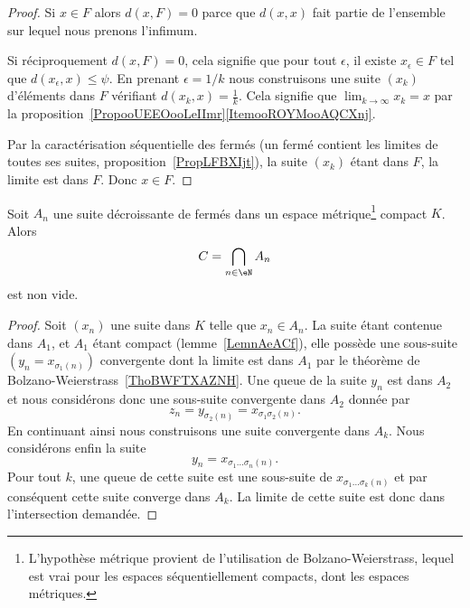 \begin{proof}
    Si \( x\in F\) alors \( d(x,F)=0\) parce que \( d(x,x)\) fait partie de l'ensemble sur lequel nous prenons l'infimum.

    Si réciproquement \( d(x,F)=0\), cela signifie que pour tout \( \epsilon\), il existe \( x_{\epsilon}\in F\) tel que \( d(x_{\epsilon},x)\leq \psi\). En prenant \(\epsilon=1/k\) nous construisons une suite \( (x_k)\) d'éléments dans \( F\) vérifiant \( d(x_k,x)=\frac{1}{ k }\). Cela signifie que \( \lim_{k\to \infty} x_k=x\) par la proposition~\ref{PropooUEEOooLeIImr}\ref{ItemooROYMooAQCXnj}.

    Par la caractérisation séquentielle des fermés (un fermé contient les limites de toutes ses suites, proposition~\ref{PropLFBXIjt}), la suite \( (x_k)\) étant dans \( F\), la limite est dans \( F\). Donc \( x\in F\).
\end{proof}


\begin{lemma}       \label{LemooynkH}
    Soit \( A_n\) une suite décroissante de fermés dans un espace métrique\footnote{L'hypothèse métrique provient de l'utilisation de Bolzano-Weierstrass, lequel est vrai pour les espaces séquentiellement compacts, dont les espaces métriques.} compact \( K\). Alors
    \begin{equation}
        C=\bigcap_{n\in \eN}A_n
    \end{equation}
    est non vide.
\end{lemma}

\begin{proof}
    Soit \( (x_n)\) une suite dans \( K\) telle que \( x_n\in A_n\). La suite étant contenue dans \( A_1\), et \( A_1\) étant compact (lemme~\ref{LemnAeACf}), elle possède une sous-suite \( (y_n=x_{\sigma_1(n)})\) convergente dont la limite est dans \( A_1\) par le théorème de Bolzano-Weierstrass~\ref{ThoBWFTXAZNH}. Une queue de la suite \( y_n\) est dans \( A_2\) et nous considérons donc une sous-suite convergente dans \( A_2\) donnée par
    \begin{equation}
        z_n=y_{\sigma_2(n)}=x_{\sigma_1\sigma_2(n)}.
    \end{equation}
    En continuant ainsi nous construisons une suite convergente dans \( A_k\). Nous considérons enfin la suite
    \begin{equation}
        y_n=x_{\sigma_1\ldots \sigma_n(n)}.
    \end{equation}
    Pour tout \( k\), une queue de cette suite est une sous-suite de \( x_{\sigma_1\ldots \sigma_k(n)}\) et par conséquent cette suite converge dans \( A_k\). La limite de cette suite est donc dans l'intersection demandée.
\end{proof}

